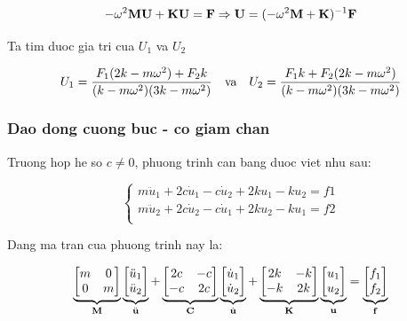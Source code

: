 \begin{equation}
    -\omega^2{\bf M}{\bf U} + {\bf K}{\bf U} = {\bf F} \Rightarrow {\bf U} = (-\omega^2{\bf M}+{\bf K})^{-1} {\bf F}
\end{equation}

Ta tim duoc gia tri cua $U_1$ va $U_2$

\begin{equation}
    U_1 = \frac{F_1(2k-m\omega^2)+F_2k}{(k-m\omega^2)(3k-m\omega^2)} \quad \hbox{va} \quad U_2 = \frac{F_1k+F_2(2k-m\omega^2)}{(k-m\omega^2)(3k-m\omega^2)}
\end{equation}

\subsubsection{Dao dong cuong buc - co giam chan}

Truong hop he so $c \neq 0$, phuong trinh can bang duoc viet nhu sau:

\begin{equation}\label{eq_PT2dofs_c}
    \begin{cases}
        m \ddot{u}_1 + 2c\dot{u}_1 - c\dot{u}_2 + 2ku_1 - ku_2 = f1 \\
        m \ddot{u}_2 + 2c\dot{u}_2 - c\dot{u}_1 + 2ku_2 - ku_1 = f2 \\
    \end{cases}
\end{equation}

Dang ma tran cua phuong trinh nay la:

\begin{equation}\label{eq_PT2dofs_c_matrix}
    \underbrace{\begin{bmatrix}
        m & 0\\ 0 & m
    \end{bmatrix}}_{\bf M}\underbrace{\begin{bmatrix}
        \ddot{u}_1 \\ \ddot{u}_2
    \end{bmatrix}}_{\ddot{\bf u}} + \underbrace{\begin{bmatrix}
        2c & -c \\ -c & 2c
    \end{bmatrix}}_{\bf C}\underbrace{\begin{bmatrix}
        \dot{u}_1 \\ \dot{u}_2
    \end{bmatrix}}_{\dot{\bf u}} +\underbrace{\begin{bmatrix}
        2k & -k \\ -k & 2k
    \end{bmatrix}}_{\bf K} \underbrace{\begin{bmatrix}
        u_1 \\ u_2
    \end{bmatrix}}_{\bf u} = \underbrace{\begin{bmatrix}
        f_1 \\ f_2
    \end{bmatrix}}_{\bf f} 
\end{equation}

